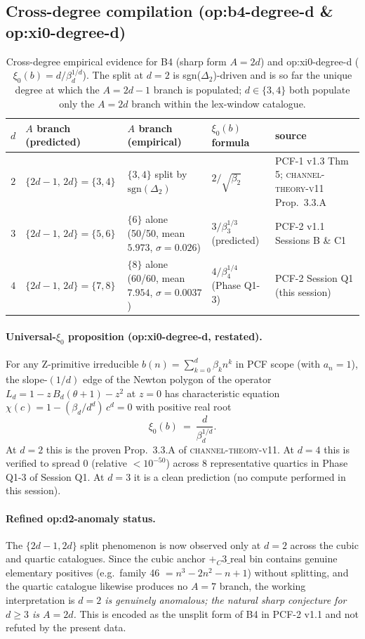 \subsection*{Cross-degree compilation (op:b4-degree-d \& op:xi0-degree-d)}

\begin{table}[h]
\centering
\begin{tabular}{cllll}
\hline
$d$ & $A$ branch (predicted) & $A$ branch (empirical) & $\xi_0(b)$ formula & source \\
\hline
$2$ & $\{2d-1,\,2d\}=\{3,4\}$ & $\{3,4\}$ split by
       $\mathrm{sgn}(\Delta_2)$ & $2/\sqrt{\beta_2}$ &
       PCF-1 v1.3 Thm 5; \textsc{channel-theory-v11} Prop.~3.3.A \\
$3$ & $\{2d-1,\,2d\}=\{5,6\}$ & $\{6\}$ alone (50/50,
       mean $5.973$, $\sigma=0.026$) & $3/\beta_3^{1/3}$ (predicted) &
       PCF-2 v1.1 Sessions B \& C1 \\
$4$ & $\{2d-1,\,2d\}=\{7,8\}$ & $\{8\}$ alone (60/60,
       mean $7.954$, $\sigma=0.0037$) & $4/\beta_4^{1/4}$ (Phase Q1-3) &
       PCF-2 Session Q1 (this session) \\
\hline
\end{tabular}
\caption{Cross-degree empirical evidence for B4 (sharp form
$A=2d$) and op:xi0-degree-d ($\xi_0(b)=d/\beta_d^{1/d}$).
The split at $d=2$ is sgn($\Delta_2$)-driven and is so far the unique
degree at which the $A=2d-1$ branch is populated; $d\in\{3,4\}$ both
populate only the $A=2d$ branch within the lex-window catalogue.}
\label{tab:cross_degree_q1}
\end{table}

\paragraph{Universal-$\xi_0$ proposition (op:xi0-degree-d, restated).}
For any Z-primitive irreducible $b(n)=\sum_{k=0}^{d}\beta_k n^k$ in
PCF scope (with $a_n=1$), the slope-$(1/d)$ edge of the Newton
polygon of the operator $L_d=1-z\,B_d(\theta+1)-z^2$ at $z=0$ has
characteristic equation $\chi(c)=1-(\beta_d/d^d)\,c^d=0$ with
positive real root
\[
\xi_0(b)\ =\ \frac{d}{\beta_d^{1/d}}.
\]
At $d=2$ this is the proven Prop.~3.3.A of \textsc{channel-theory-v11}.
At $d=4$ this is verified to spread $0$ (relative $<10^{-50}$) across
$8$ representative quartics in Phase Q1-3 of Session Q1. At $d=3$ it
is a clean prediction (no compute performed in this session).

\paragraph{Refined op:d2-anomaly status.}
The $\{2d-1,2d\}$ split phenomenon is now observed only at $d=2$
across the cubic and quartic catalogues. Since the cubic anchor
$+_C3\_\mathrm{real}$ bin contains genuine elementary positives (e.g.\
family 46 $=n^3-2n^2-n+1$) without splitting, and the quartic catalogue
likewise produces no $A=7$ branch, the working interpretation is
\emph{$d=2$ is genuinely anomalous; the natural sharp conjecture for
$d\ge 3$ is $A=2d$.}  This is encoded as the unsplit form of B4 in
PCF-2 v1.1 and not refuted by the present data.

